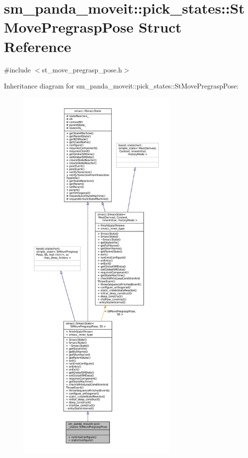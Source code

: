 \hypertarget{structsm__panda__moveit_1_1pick__states_1_1StMovePregraspPose}{}\section{sm\+\_\+panda\+\_\+moveit\+:\+:pick\+\_\+states\+:\+:St\+Move\+Pregrasp\+Pose Struct Reference}
\label{structsm__panda__moveit_1_1pick__states_1_1StMovePregraspPose}


{\ttfamily \#include $<$st\+\_\+move\+\_\+pregrasp\+\_\+pose.\+h$>$}



Inheritance diagram for sm\+\_\+panda\+\_\+moveit\+:\+:pick\+\_\+states\+:\+:St\+Move\+Pregrasp\+Pose\+:
\nopagebreak
\begin{figure}[H]
\begin{center}
\leavevmode
\includegraphics[height=550pt]{structsm__panda__moveit_1_1pick__states_1_1StMovePregraspPose__inherit__graph}
\end{center}
\end{figure}


